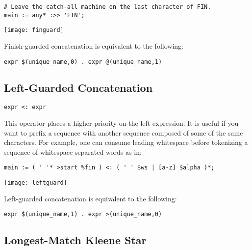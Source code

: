 \documentclass[letterpaper,11pt,oneside]{book}
\newcommand{\verbspace}{\vspace{10pt}}
\newenvironment{inline_code}{\def\baselinestretch{1}\vspace{12pt}\small}{}
\begin{document}
\begin{inline_code}
\begin{verbatim}
# Leave the catch-all machine on the last character of FIN.
main := any* :>> 'FIN';
\end{verbatim}
\end{inline_code}

\begin{center}
\texttt{[image: finguard]}
\end{center}

Finish-guarded concatenation is equivalent to the following:

\verbspace
\begin{verbatim}
expr $(unique_name,0) . expr @(unique_name,1)
\end{verbatim}

\subsection{Left-Guarded Concatenation}

\verb|expr <: expr| 
\verbspace

This operator places
a higher priority on the left expression. It is useful if you want to prefix a
sequence with another sequence composed of some of the same characters. For
example, one can consume leading whitespace before tokenizing a sequence of
whitespace-separated words as in:

\begin{inline_code}
\begin{verbatim}
main := ( ' '* >start %fin ) <: ( ' ' $ws | [a-z] $alpha )*;
\end{verbatim}
\end{inline_code}

\begin{center}
\texttt{[image: leftguard]}
\end{center}

Left-guarded concatenation is equivalent to the following:

\verbspace
\begin{verbatim}
expr $(unique_name,1) . expr >(unique_name,0)
\end{verbatim}
\verbspace

\subsection{Longest-Match Kleene Star}
\label{longest_match_kleene_star}
\end{document}
